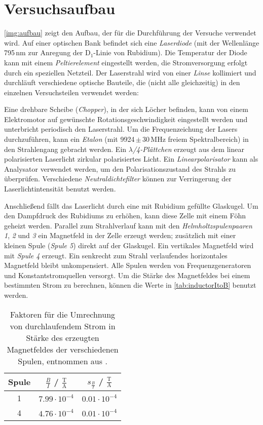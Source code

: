 \section{Versuchsaufbau}
\autoref{img:aufbau} zeigt den Aufbau, der für die Durchführung der Versuche
verwendet wird.
Auf einer optischen Bank befindet sich eine \emph{Laserdiode} (mit der Wellenlänge
795\,nm zur Anregung der D$_1$-Linie von Rubidium).
Die Temperatur der Diode kann mit einem \emph{Peltierelement} eingestellt werden,
die Stromversorgung erfolgt durch ein speziellen Netzteil.
Der Laserstrahl wird von einer \emph{Linse} kollimiert und durchläuft verschiedene
optische Bauteile, die (nicht alle gleichzeitig) in den einzelnen Versuchsteilen
verwendet werden:

Eine drehbare Scheibe (\emph{Chopper}), in der sich Löcher befinden, kann von
einem Elektromotor auf gewünschte Rotationsgeschwindigkeit eingestellt werden und unterbricht periodisch
den Laserstrahl.
Um die Fre\-quenz\-eich\-ung der Lasers durchzuführen, kann ein \emph{Etalon}
(mit 9924\,$\pm$\,30\,MHz freiem Spektralbereich) in den Strahlengang gebracht werden.
Ein \emph{$\lambda$/4-Plättchen} erzeugt aus dem linear polarisierten Laserlicht zirkular polarisiertes Licht.
Ein \emph{Linearpolarisator} kann als Analysator verwendet werden, um den Polarisationszustand
des Strahls zu überprüfen. Verschiedene \emph{Neutraldichtefilter} können zur Verringerung der Laserlichtintensität
benutzt werden.

Anschließend fällt das Laserlicht durch eine mit Rubidium gefüllte Glaskugel.
Um den Dampfdruck des Rubidiums zu erhöhen, kann diese Zelle mit einem Föhn geheizt werden.
Parallel zum Strahlverlauf kann mit den \emph{Helmholtzspulenpaaren 1}, \emph{2} und \emph{3}
ein Magnetfeld in der Zelle erzeugt werden;
zusätzlich mit einer kleinen Spule (\emph{Spule 5}) direkt auf der Glaskugel.
Ein vertikales Magnetfeld wird mit \emph{Spule 4} erzeugt.
Ein senkrecht zum Strahl verlaufendes horizontales Magnetfeld bleibt unkompensiert.
Alle Spulen werden von Frequenzgeneratoren und Konstantstromquellen versorgt.
Um die Stärke des Magnetfeldes bei einem bestimmten Strom zu berechnen, können die Werte in \autoref{tab:inductorItoB} benutzt werden.
\begin{table}[H]
\caption{Faktoren für die Umrechnung von durchlaufendem Strom in Stärke des erzeugten Magnetfeldes der verschiedenen Spulen, 
		 entnommen aus \cite{manual}.}
\begin{center}
\begin{tabular}{|c|c|c|}
    \hline
    Spule	& $\frac{B}{I}$ / $\frac{\text{T}}{\text{A}}$	& $s_{\frac{B}{I}}$ / $\frac{\text{T}}{\text{A}}$	\\ \hline
    1		& $7.99 \cdot 10^{-4}$							& $0.01 \cdot 10^{-4}$							\\ \hline
    4		& $4.76 \cdot 10^{-4}$							& $0.01 \cdot 10^{-4}$							\\ \hline
\end{tabular}
\end{center}
\label{tab:inductorItoB}
\end{table}

